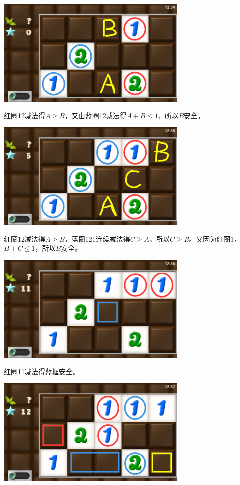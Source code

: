 \subsection{} %
\begin{center}
    \includegraphics[width=0.7\textwidth]{puzzle/85-1.png}
\end{center}
红圈12减法得$A\ge B$，又由蓝圈12减法得$A+B\le 1$，所以$B$安全。
\begin{center}
    \includegraphics[width=0.7\textwidth]{puzzle/85-2.png}
\end{center}
红圈12减法得$A\ge B$，蓝圈121连续减法得$C\ge A$，所以$C\ge B$。又因为红圈1，$B+C\le 1$，所以$B$安全。
\begin{center}
    \includegraphics[width=0.7\textwidth]{puzzle/85-3.png}
\end{center}
红圈11减法得蓝框安全。
\begin{center}
    \includegraphics[width=0.7\textwidth]{puzzle/85-4.png}
\end{center}
